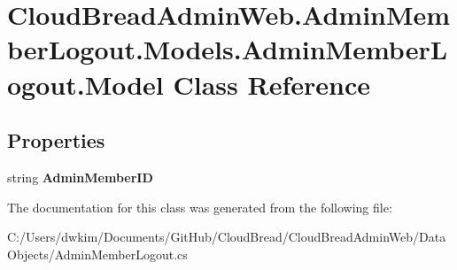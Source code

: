 \hypertarget{class_cloud_bread_admin_web_1_1_admin_member_logout_1_1_models_1_1_admin_member_logout_1_1_model}{}\section{Cloud\+Bread\+Admin\+Web.\+Admin\+Member\+Logout.\+Models.\+Admin\+Member\+Logout.\+Model Class Reference}
\label{class_cloud_bread_admin_web_1_1_admin_member_logout_1_1_models_1_1_admin_member_logout_1_1_model}
\subsection*{Properties}
\begin{DoxyCompactItemize}
\item 
string {\bfseries Admin\+Member\+ID}\hypertarget{class_cloud_bread_admin_web_1_1_admin_member_logout_1_1_models_1_1_admin_member_logout_1_1_model_a8b918f836ea00a42ad40528eddb85d0c}{}\label{class_cloud_bread_admin_web_1_1_admin_member_logout_1_1_models_1_1_admin_member_logout_1_1_model_a8b918f836ea00a42ad40528eddb85d0c}

\end{DoxyCompactItemize}


The documentation for this class was generated from the following file\+:\begin{DoxyCompactItemize}
\item 
C\+:/\+Users/dwkim/\+Documents/\+Git\+Hub/\+Cloud\+Bread/\+Cloud\+Bread\+Admin\+Web/\+Data\+Objects/Admin\+Member\+Logout.\+cs\end{DoxyCompactItemize}
